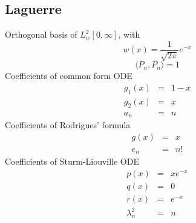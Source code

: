 \documentclass[11pt]{article}
\begin{document}
\subsection{Laguerre}
Orthogonal basis of $L^2_w[0,\infty]$, with
\[w(x) = \frac{1}{\sqrt{2\pi}}e^{-x}\] 
\[\langle P_n,P_n\rangle = 1\]
Coefficients of common form ODE
\begin{eqnarray*}
g_1(x) &=& 1 - x\\
g_2(x) &=& x\\
a_n &=& n
\end{eqnarray*}
Coefficients of Rodrigues' formula
 \begin{eqnarray*}
g(x) &=& x \\
e_n &=& n!
\end{eqnarray*}
Coefficients of Sturm-Liouville ODE
\begin{eqnarray*}
p(x) &=& xe^{-x}\\
q(x) &=& 0\\
r(x) &=& e^{-x}\\
\lambda^2_n &=& n
\end{eqnarray*}
\end{document}
